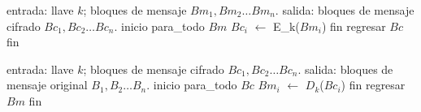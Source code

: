 \begin{pseudocodigo}[%
    caption={\Gls{gl:modo_de_operacion} \gls{gl:ecb}, cifrado.}%
  ]
    entrada: llave $ k $; bloques de mensaje $ Bm_1, Bm_2 \dots Bm_n $.
    salida:  bloques de mensaje cifrado $ Bc_1, Bc_2 \dots Bc_n $.
    inicio
      para_todo $Bm$
        $Bc_i$ $\gets$ E_k($Bm_i$)
      fin
      regresar $Bc$
    fin
\end{pseudocodigo}

\begin{pseudocodigo}[%
    caption={\Gls{gl:modo_de_operacion} \gls{gl:ecb}, descifrado.}%
  ]
    entrada: llave $ k $; bloques de mensaje cifrado $ Bc_1, Bc_2 \dots Bc_n $.
    salida:  bloques de mensaje original $ B_1, B_2 \dots B_n $.
    inicio
      para_todo $Bc$
        $Bm_i$ $\gets$ $D_k$($Bc_i$)
      fin
      regresar $Bm$
    fin
\end{pseudocodigo}
